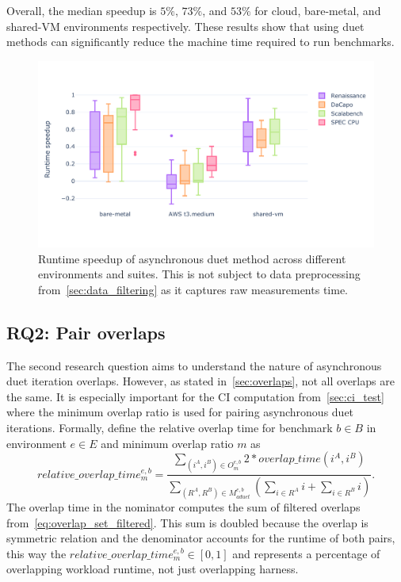 Overall, the median speedup is $5\%$, $73\%$, and $53\%$ for cloud, bare-metal, and shared-VM environments respectively.
These results show that using duet methods can significantly reduce the machine time required to run benchmarks.

\begin{figure}
	\centering
	\includegraphics[width=.9\linewidth]{./figures/runtime_speedup.pdf}
	\caption{
		Runtime speedup of asynchronous duet method across different environments and suites.
		This is not subject to data preprocessing from~\cref{sec:data_filtering} as it captures raw measurements time.
	}
	\label{fig:runtime_speedup}
\end{figure}

\subsection{RQ2: Pair overlaps}
\label{sec:rq2}

The second research question aims to understand the nature of asynchronous duet iteration overlaps.
However, as stated in~\cref{sec:overlaps}, not all overlaps are the same.
It is especially important for the CI computation from~\ref{sec:ci_test} where the minimum overlap ratio is used for pairing asynchronous duet iterations.
Formally, define the relative overlap time for benchmark $b \in B$ in environment $e \in E$ and minimum overlap ratio $m$ as
\begin{equation}\label{eq:relative_overlap_time}
relative\_overlap\_time^{e, b}_m = \frac{\sum\limits_{(i^A, i^B) \in O^{e,b}_m} 2 * overlap\_time(i^A, i^B)}{\sum\limits_{(R^A, R^B) \in M^{e, b}_{aduet}}\left(\sum\limits_{i \in R^A} i + \sum\limits_{i \in R^B} i\right)}.
\end{equation}
The overlap time in the nominator computes the sum of filtered overlaps from~\cref{eq:overlap_set_filtered}.
This sum is doubled because the overlap is symmetric relation and the denominator accounts for the runtime of both pairs, this way the $relative\_overlap\_time^{e, b}_m \in [0, 1]$ and represents a percentage of overlapping workload runtime, not just overlapping harness.


